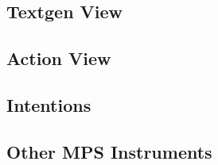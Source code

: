 \subsection{Textgen View}

\subsection{Action View}

\subsection{Intentions}

\subsection{Other MPS Instruments}




